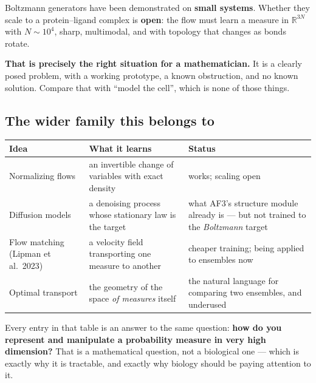\begin{critbox}[title={The honest caveat --- and it is a serious one}]
Boltzmann generators have been demonstrated on \textbf{small systems}. Whether they scale to a
protein--ligand complex is \textbf{open}: the flow must learn a measure in $\mathbb{R}^{3N}$ with
$N\sim10^4$, sharp, multimodal, and with topology that changes as bonds rotate.

\textbf{That is precisely the right situation for a mathematician.} It is a clearly posed problem,
with a working prototype, a known obstruction, and no known solution. Compare that with ``model the
cell'', which is none of those things.
\end{critbox}

\subsection{The wider family this belongs to}

\begin{center}\small
\begin{tabular}{@{}>{\raggedright\arraybackslash}p{4.3cm}>{\raggedright\arraybackslash}p{6.3cm}>{\raggedright\arraybackslash}p{5.7cm}@{}}
\toprule
\rowcolor{measure!13}
\textbf{\color{measure}Idea} & \textbf{\color{measure}What it learns} & \textbf{\color{measure}Status}\\
\midrule
Normalizing flows & an invertible change of variables with exact density &
 works; scaling open\\
Diffusion models & a denoising process whose stationary law is the target &
 what AF3's structure module already is --- but not trained to the \emph{Boltzmann} target\\
Flow matching \newline (Lipman et al.\ 2023) & a velocity field transporting one measure to another &
 cheaper training; being applied to ensembles now\\
\rowcolor{measure!6}
Optimal transport & the geometry of the space \emph{of measures} itself &
 the natural language for comparing two ensembles, and underused\\
\bottomrule
\end{tabular}
\end{center}

\begin{thesisbox}[title={The unifying observation}]
Every entry in that table is an answer to the same question: \textbf{how do you represent and
manipulate a probability measure in very high dimension?} That is a mathematical question, not a
biological one --- which is exactly why it is tractable, and exactly why biology should be paying
attention to it.
\end{thesisbox}
